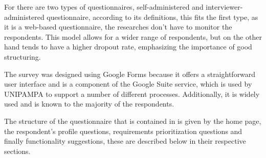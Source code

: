 
For \textcite{surveyGuidelines} there are two types of questionnaires, self-administered and interviewer-administered questionnaire, according to its definitions, this fits the first type, as it is a web-based questionnaire, the researches don't have to monitor the respondents.
This model allows for a wider range of respondents, but on the other hand tends to have a higher dropout rate, emphasizing the importance of good structuring.


The survey was designed using Google Forms because it offers a straightforward user interface and is a component of the Google Suite service, which is used by \ac{UNIPAMPA} to support a number of different processes. Additionally, it is widely used and is known to the majority of the respondents.


The structure of the questionnaire that is contained in  is given by the home page, the respondent's profile questions, requirements prioritization questions and finally functionality suggestions, these are described below in their respective sections.
